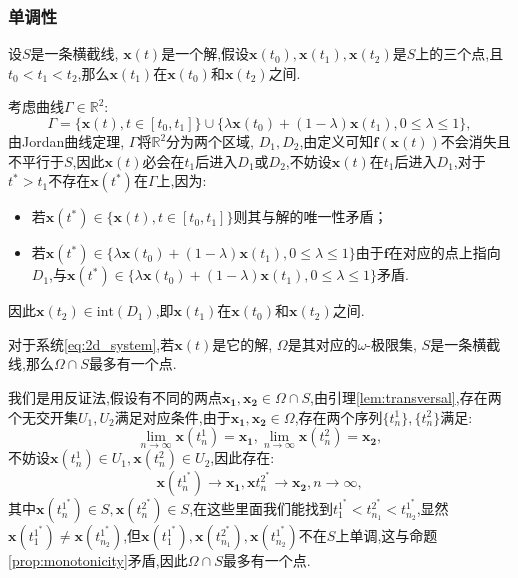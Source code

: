 \subsubsection{单调性}
\begin{prop}\label{prop:monotonicity}
    设$S$是一条横截线, $\mathbf{x}(t)$是一个解,假设$\mathbf{x}(t_0),\mathbf{x}(t_1),\mathbf{x}(t_2)$是$S$上的三个点,且$t_0<t_1<t_2$,那么$\mathbf{x}(t_1)$在$\mathbf{x}(t_0)$和$\mathbf{x}(t_2)$之间. 
\end{prop}
\begin{pf}
    考虑曲线$\Gamma\in\mathbb{R}^2$:
    \begin{equation}
        \Gamma=\{\mathbf{x}(t),t\in[t_0,t_1]\}\cup\{\lambda\mathbf{x}(t_0)+(1-\lambda)\mathbf{x}(t_1),0\leq \lambda\leq 1\},
    \end{equation}
    由Jordan曲线定理, $\Gamma$将$\mathbb{R}^2$分为两个区域, $D_1,D_2$,由定义可知$\mathbf{f}(\mathbf{x}(t))$不会消失且不平行于$S$,因此$\mathbf{x}(t)$必会在$t_1$后进入$D_1$或$D_2$,不妨设$\mathbf{x}(t)$在$t_1$后进入$D_1$,对于$t^*>t_1$不存在$\mathbf{x}(t^*)$在$\Gamma$上,因为:
    \begin{itemize}
        \item 若$\mathbf{x}(t^*)\in \{\mathbf{x}(t),t\in[t_0,t_1]\}$则其与解的唯一性矛盾；
        \item 若$\mathbf{x}(t^*)\in \{\lambda\mathbf{x}(t_0)+(1-\lambda)\mathbf{x}(t_1),0\leq \lambda\leq 1\}$由于$\mathbf{f}$在对应的点上指向$D_1$,与$\mathbf{x}(t^*)\in \{\lambda\mathbf{x}(t_0)+(1-\lambda)\mathbf{x}(t_1),0\leq \lambda\leq 1\}$矛盾. 
    \end{itemize}
    因此$\mathbf{x}(t_2)\in \text{int}(D_1)$,即$\mathbf{x}(t_1)$在$\mathbf{x}(t_0)$和$\mathbf{x}(t_2)$之间. 
\end{pf}
\begin{prop}\label{prop:at_most_one_point}
    对于系统\ref{eq:2d_system},若$\mathbf{x}(t)$是它的解, $\Omega$是其对应的$\omega$-极限集, $S$是一条横截线,那么$\Omega\cap S$最多有一个点. 
\end{prop}
\begin{pf}
    我们是用反证法,假设有不同的两点$\mathbf{x_1},\mathbf{x_2}\in\Omega\cap S$,由引理\ref{lem:transversal},存在两个无交开集$U_1,U_2$满足对应条件,由于$\mathbf{x_1},\mathbf{x_2}\in \Omega$,存在两个序列$\{t_n^1\},\{t_n^2\}$满足:
    \begin{equation}
        \lim_{n\to\infty}\mathbf{x}(t_n^1)=\mathbf{x_1},
        \lim_{n\to\infty}\mathbf{x}(t_n^2)=\mathbf{x_2},
    \end{equation}
    不妨设$\mathbf{x}(t_n^1)\in U_1,\mathbf{x}(t_n^2)\in U_2$,因此存在:
    \begin{equation}
        \mathbf{x}(t_n^{1^*})\to\mathbf{x_1}, \mathbf{x}{t_n^{{2^*}}}\to \mathbf{x_2},n\to\infty,
    \end{equation}
    其中$\mathbf{x}(t_n^{1^*})\in S,\mathbf{x}(t_n^{{2^*}})\in S$,在这些里面我们能找到$t_{1}^{1^*}<t_{n_1}^{{2^*}}<t_{n_2}^{1^*}$,显然$\mathbf{x}(t_1^{1^*})\neq \mathbf{x}(t_{n_2}^{1^*})$,但$\mathbf{x}(t_1^{1^*}),\mathbf{x}(t_{n_1}^{{2^*}}),\mathbf{x}(t_{n_2}^{1^*})$不在$S$上单调,这与命题\ref{prop:monotonicity}矛盾,因此$\Omega\cap S$最多有一个点. 
\end{pf}
